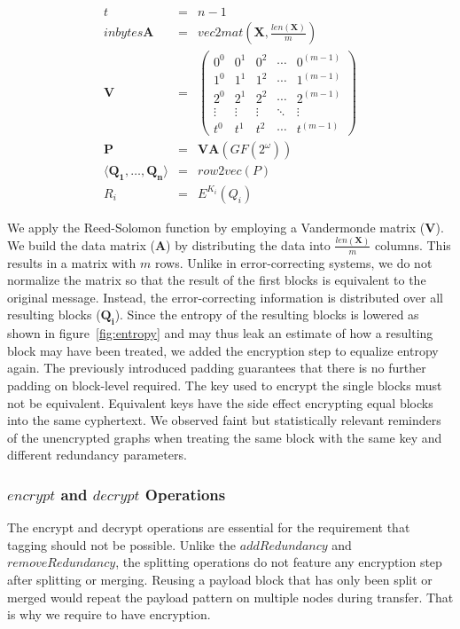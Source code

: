 \begin{eqnarray}
t          & = & n-1\\in bytes
\mathbf{A} & = & vec2mat\left(\mathbf{X},\frac{len\left(\mathbf{X}\right)}{m}\right)\\
\mathbf{V} & = & \left(\begin{matrix}
0^0 & 0^1 & 0^2 & \cdots & 0^{(m-1)} \\
1^0 & 1^1 & 1^2 & \cdots & 1^{(m-1)} \\
2^0 & 2^1 & 2^2 & \cdots & 2^{(m-1)} \\
\vdots & \vdots & \vdots & \ddots & \vdots \\
t^0 & t^1 & t^2 & \cdots & t^{(m-1)}
\end{matrix}\right)\\
\mathbf{P} & = & \mathbf{V}\mathbf{A} \left(GF\left(2^\omega\right)\right)\\
\langle \mathbf{Q_1}, \ldots , \mathbf{Q_n} \rangle & = & row2vec(P)\\
R_i & = & E^{K_i}\left(Q_i\right)
\end{eqnarray}    

We apply the Reed-Solomon function by employing a Vandermonde matrix ($\mathbf{V}$). We build the data matrix ($\mathbf{A}$) by distributing the data into $\frac{len\left(\mathbf{X}\right)}{m}$ columns. This results in a matrix with $m$ rows. Unlike in error-correcting systems, we do not normalize the matrix so that the result of the first blocks is equivalent to the original message. Instead, the error-correcting information is distributed over all resulting blocks ($\mathbf{Q_i}$). Since the entropy of the resulting blocks is lowered as shown in figure~\ref{fig:entropy} and may thus leak an estimate of how a resulting block may have been treated, we added the encryption step to equalize entropy again. The previously introduced padding guarantees that there is no further padding on block-level required. The key used to encrypt the single blocks must not be equivalent. Equivalent keys have the side effect encrypting equal blocks into the same cyphertext. We observed faint but statistically relevant reminders of the unencrypted graphs when treating the same block with the same key and different redundancy parameters.

\subsubsection{$encrypt$ and $decrypt$ Operations}
The encrypt and decrypt operations are essential for the requirement that tagging should not be possible. Unlike the $addRedundancy$ and $removeRedundancy$, the splitting operations do not feature any encryption step after splitting or merging. Reusing a payload block that has only been split or merged would repeat the payload pattern on multiple nodes during transfer. That is why we require to have encryption.

